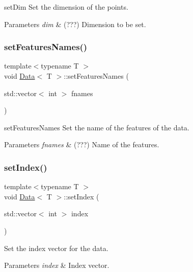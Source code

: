 set\+Dim Set the dimension of the points. 


\begin{DoxyParams}{Parameters}
{\em dim} & (???) Dimension to be set. \\
\hline
\end{DoxyParams}
\mbox{\label{class_data_a3b22a1e56ab54ca6ecd84bef0ad968cc}} 
\subsubsection{\texorpdfstring{set\+Features\+Names()}{setFeaturesNames()}}
{\footnotesize\ttfamily template$<$typename T $>$ \\
void \mbox{\hyperlink{class_data}{Data}}$<$ T $>$\+::set\+Features\+Names (\begin{DoxyParamCaption}\item[{std\+::vector$<$ int $>$}]{fnames }\end{DoxyParamCaption})}



set\+Features\+Names Set the name of the features of the data. 


\begin{DoxyParams}{Parameters}
{\em fnames} & (???) Name of the features. \\
\hline
\end{DoxyParams}
\mbox{\label{class_data_a3e03ebfa95d7d90d4ee3b024af7b18de}} 
\subsubsection{\texorpdfstring{set\+Index()}{setIndex()}}
{\footnotesize\ttfamily template$<$typename T $>$ \\
void \mbox{\hyperlink{class_data}{Data}}$<$ T $>$\+::set\+Index (\begin{DoxyParamCaption}\item[{std\+::vector$<$ int $>$}]{index }\end{DoxyParamCaption})}



Set the index vector for the data. 


\begin{DoxyParams}{Parameters}
{\em index} & Index vector. \\
\hline
\end{DoxyParams}
\mbox{\label{class_data_ade1a5caf2f463a894e1d348f728b56cf}} 
